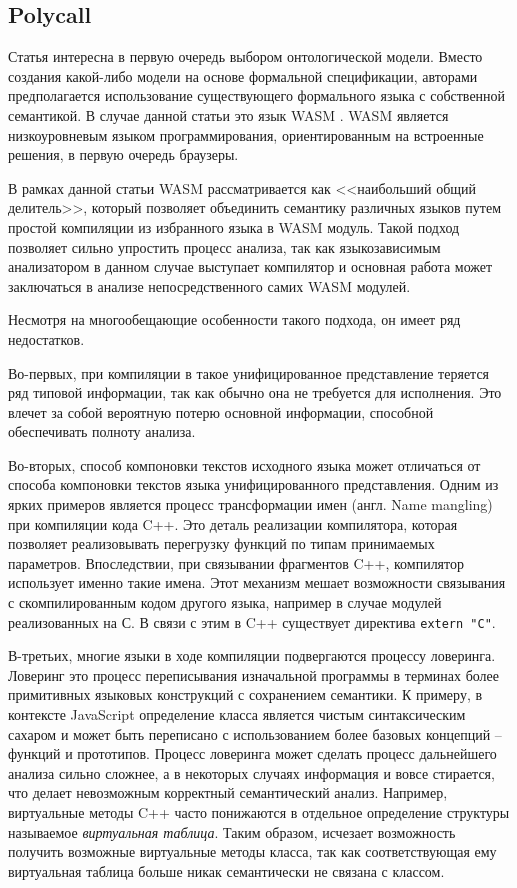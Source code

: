 \subsection{Polycall} \label{ssec:polycall}

Статья \cite{polycall} интересна в первую очередь выбором онтологической модели. Вместо создания 
какой-либо модели на основе формальной спецификации, авторами предполагается использование
существующего формального языка с собственной семантикой. В случае данной статьи это язык WASM \cite{wasm}.
WASM является низкоуровневым языком программирования, ориентированным на встроенные решения, в первую очередь 
браузеры.

В рамках данной статьи WASM рассматривается как <<наибольший общий делитель>>, который позволяет объединить
семантику различных языков путем простой компиляции из избранного языка в WASM модуль. Такой подход позволяет
сильно упростить процесс анализа, так как языкозависимым анализатором в данном случае выступает компилятор и
основная работа может заключаться в анализе непосредственного самих WASM модулей.

Несмотря на многообещающие особенности такого подхода, он имеет ряд недостатков. 

Во-первых, при компиляции в такое унифицированное представление теряется ряд типовой информации, так как обычно она не требуется для исполнения.
Это влечет за собой вероятную потерю основной информации, способной обеспечивать полноту анализа. 

Во-вторых, способ компоновки текстов исходного языка может отличаться от способа компоновки текстов языка унифицированного представления.
Одним из ярких примеров является процесс трансформации имен (англ. Name mangling) при компиляции кода C++. Это деталь реализации
компилятора, которая позволяет реализовывать перегрузку функций по типам принимаемых параметров. Впоследствии, при связывании
фрагментов C++, компилятор использует именно такие имена. Этот механизм мешает возможности связывания с скомпилированным кодом
другого языка, например в случае модулей реализованных на С. В связи с этим в C++ существует директива \texttt{extern "C"}.

В-третьих, многие языки в ходе компиляции подвергаются процессу ловеринга. Ловеринг это процесс переписывания изначальной программы
в терминах более примитивных языковых конструкций с сохранением семантики. К примеру, в контексте JavaScript определение
класса является чистым синтаксическим сахаром и может быть переписано с использованием более базовых концепций -- функций и прототипов.
Процесс ловеринга может сделать процесс дальнейшего анализа сильно сложнее, а в некоторых случаях информация и вовсе стирается, что
делает невозможным корректный семантический анализ. Например, виртуальные методы C++ часто понижаются в отдельное определение
структуры называемое \textit{виртуальная таблица}. Таким образом, исчезает возможность получить возможные виртуальные методы
класса, так как соответствующая ему виртуальная таблица больше никак семантически не связана с классом.

